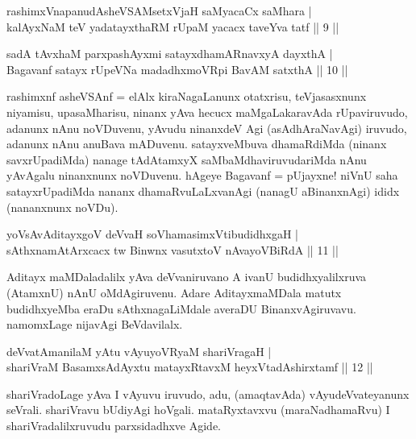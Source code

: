 
\begin{shl}
rashimxVnapanudAsheVSAMsetxVjaH saMyacaCx saMhara | \\
kalAyxNaM teV yadatayxthaRM rUpaM yacacx taveYva tatf \hfill||  9 || 
\end{shl}

\begin{shl}
sadA tAvx\s haM parxpashAyxmi satayxdhamARnavxyA dayxthA  | \\
Bagavanf satayx rUpeVNa madadhxmoVR\s pi BavAM satxthA \hfill||  10 || 
\end{shl}

\begin{artha} 
rashimxnf asheVSAnf = elAlx kiraNagaLanunx otatxrisu, teVjasasxnunx 
niyamisu, upasaMharisu, ninanx yAva hecucx maMgaLakaravAda 
rUpaviruvudo, adanunx nAnu noVDuvenu, yAvudu ninanxdeV Agi 
(asAdhAraNavAgi) iruvudo, adanunx nAnu anuBava mADuvenu. satayxveMbuva 
dhamaRdiMda (ninanx savxrUpadiMda) nanage tAdAtamxyX 
saMbaMdhaviruvudariMda nAnu yAvAgalu ninanxnunx noVDuvenu. hAgeye 
Bagavanf = pUjayxne! niVnU saha satayxrUpadiMda nananx 
dhamaRvuLaLxvanAgi (nanagU aBinanxnAgi) ididx (nananxnunx noVDu).
\end{artha}


\begin{shl}
yoV\s sAvAditayxgoV deVvaH soV\s hamasimxVtibudidhxgaH | \\
sAthxnamAtArxcacx tw Binwnx vasutxtoV nA\s \s vayoVBiRdA \hfill||  11 || 
\end{shl}

\begin{artha} 
Aditayx maMDaladalilx yAva deVvaniruvano A ivanU budidhxyalilxruva 
(AtamxnU) nAnU oMdAgiruvenu. Adare AditayxmaMDala matutx budidhxyeMba 
eraDu sAthxnagaLiMdale averaDU BinanxvAgiruvavu. namomxLage nijavAgi 
BeVdavilalx.
\end{artha}


\begin{shl}
deVvatAmanilaM yAtu vAyuyoVR\s yaM shariVragaH | \\
shariVraM BasamxsAdAyxtu matayxRtavxM heyxVtadAshirxtamf \hfill||  12 || 
\end{shl}

\begin{artha} 
shariVradoLage yAva I vAyuvu iruvudo, adu, (amaqtavAda) 
vAyudeVvateyanunx seVrali. shariVravu bUdiyAgi hoVgali. mataRyxtavxvu 
(maraNadhamaRvu) I shariVradalilxruvudu parxsidadhxve Agide.
\end{artha}

